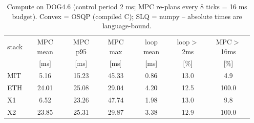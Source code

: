 \begin{table}[t]\centering
\caption{Compute on DOG4.6 (control period 2 ms; MPC re-plans every 8 ticks = 16 ms budget). Convex = OSQP (compiled C); SLQ = numpy -- absolute times are language-bound.}
\label{tab:timing}
\begin{tabular}{lcccccc}
\toprule
stack & MPC mean & MPC p95 & MPC max & loop mean & loop$>$2ms & MPC$>$16ms \\
 & [ms] & [ms] & [ms] & [ms] & [\%] & [\%] \\
\midrule
MIT & 5.16 & 15.23 & 45.33 & 0.86 & 13.0 & 4.9 \\
ETH & 24.01 & 25.08 & 29.04 & 4.20 & 12.5 & 100.0 \\
X1 & 6.52 & 23.26 & 47.74 & 1.98 & 13.0 & 9.8 \\
X2 & 23.85 & 25.31 & 29.87 & 3.38 & 12.9 & 100.0 \\
\bottomrule
\end{tabular}
\end{table}
